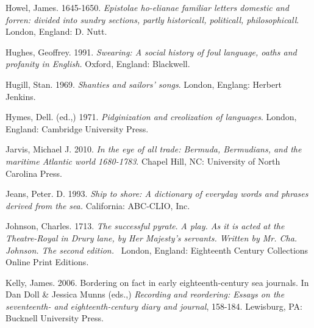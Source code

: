 \begin{styleStandard}
Howel, James. 1645-1650. \textit{Epistolae ho-elianae familiar letters domestic and forren: divided into sundry sections, partly historicall, politicall, philosophicall}. London, England: D. Nutt.
\end{styleStandard}


\begin{styleStandard}
Hughes, Geoffrey. 1991.\textit{ Swearing: A social history of foul language, oaths and profanity in English. }Oxford, England: Blackwell. 
\end{styleStandard}


\begin{styleStandard}
Hugill, Stan. 1969. \textit{Shanties and sailors’ song}\textit{s}. London, Englang: Herbert Jenkins. 
\end{styleStandard}


\begin{styleStandard}
Hymes, Dell. (ed.,) 1971. \textit{Pidginization and creolization of languages}. London, England: Cambridge University Press.
\end{styleStandard}


\begin{styleStandard}
Jarvis, Michael J. 2010. \textit{In the eye of all trade: Bermuda, Bermudians, and the maritime Atlantic world 1680-1783}. Chapel Hill, NC: University of North Carolina Press.
\end{styleStandard}


\begin{styleStandard}
Jeans, Peter. D. 1993. \textit{Ship to shore: A dictionary of everyday words and phrases derived from the} \textit{sea.} California: ABC-CLIO, Inc.
\end{styleStandard}


\begin{styleStandard}
Johnson, Charles. 1713. \textit{The successful pyrate}. \textit{A play. As it is acted at the Theatre-Royal in Drury lane, by Her Majesty’s servants. Written by Mr. Cha. Johnson. The second edition.} \ London, England: Eighteenth Century Collections Online Print Editions. 
\end{styleStandard}


\begin{styleStandard}
Kelly, James. 2006. Bordering on fact in early eighteenth-century sea journals. In Dan Doll \& Jessica Munns (eds.,) \textit{Recording and reordering: Essays on the seventeenth- and eighteenth-century diary and journal}, 158-184. Lewisburg, PA: Bucknell University Press.\ \ 
\end{styleStandard}


